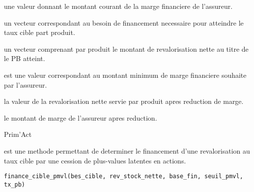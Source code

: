 \documentclass[a4paper]{book}
\begin{document}
\begin{Arguments}
\begin{ldescription}
\item[\code{marge\_fin}] une valeur  donnant le montant courant de la marge financiere de l'assureur.

\item[\code{bes\_cible}] un vecteur  correspondant au besoin de financement necessaire pour atteindre
le taux cible part produit.

\item[\code{rev\_stock\_nette}] un vecteur  comprenant par produit
le montant de revalorisation nette au titre de le PB atteint.

\item[\code{marge\_min}] est une valeur  correspondant
au montant minimum de marge financiere souhaite par l'assureur.
\end{ldescription}
\end{Arguments}
%
\begin{Value}
 la valeur de la revalorisation nette servie par produit apres reduction de marge.

 le montant de marge de l'assureur apres reduction.
\end{Value}
%
\begin{Author}\relax
Prim'Act
\end{Author}
%
\begin{Description}\relax
{} est une methode permettant de
determiner le financement d'une revalorisation au taux cible par une cession de plus-values latentes en actions.
\end{Description}
%
\begin{Usage}
\begin{verbatim}
finance_cible_pmvl(bes_cible, rev_stock_nette, base_fin, seuil_pmvl, tx_pb)
\end{verbatim}
\end{Usage}
%
\end{document}
